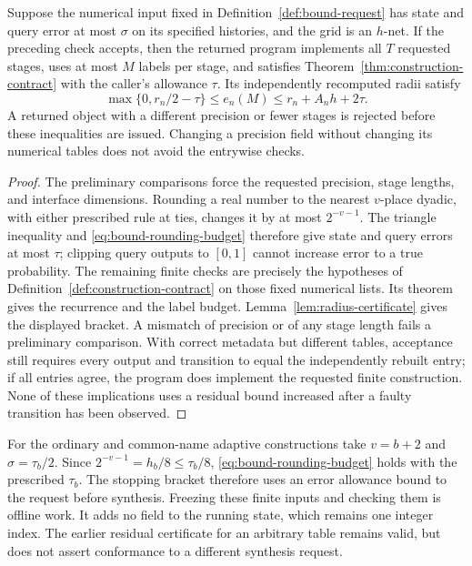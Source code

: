 \begin{proposition}
\label{prop:request-conformance}
Suppose the numerical input fixed in Definition~\ref{def:bound-request}
has state and query error at most $\sigma$ on its specified histories,
and the grid is an $h$-net. If the preceding check accepts, then the
returned program implements all $T$ requested stages, uses at most $M$
labels per stage, and satisfies Theorem~\ref{thm:construction-contract}
with the caller's allowance $\tau$. Its independently recomputed radii
satisfy
\[
 \max\{0,r_n/2-\tau\}\le e_n(M)
      \le r_n+A_nh+2\tau.
\]
A returned object with a different precision or fewer stages is rejected
before these inequalities are issued. Changing a precision field without
changing its numerical tables does not avoid the entrywise checks.
\end{proposition}
\begin{proof}
The preliminary comparisons force the requested precision, stage lengths,
and interface dimensions. Rounding a real number to the nearest
$v$-place dyadic, with either prescribed rule at ties, changes it by at
most $2^{-v-1}$. The triangle inequality and
\eqref{eq:bound-rounding-budget} therefore give state and query errors
at most $\tau$; clipping query outputs to $[0,1]$ cannot increase
error to a true probability. The remaining finite checks are precisely
the hypotheses of Definition~\ref{def:construction-contract} on those
fixed numerical lists. Its theorem gives the recurrence and the label
budget. Lemma~\ref{lem:radius-certificate} gives the displayed bracket.
A mismatch of precision or of any stage length fails a preliminary
comparison. With correct metadata but different tables, acceptance still
requires every output and transition to equal the independently rebuilt
entry; if all entries agree, the program does implement the requested
finite construction. None of these implications uses a residual bound
increased after a faulty transition has been observed.
\end{proof}

For the ordinary and common-name adaptive constructions take $v=b+2$
and $\sigma=\tau_b/2$. Since $2^{-v-1}=h_b/8\le\tau_b/8$,
\eqref{eq:bound-rounding-budget} holds with the prescribed $\tau_b$.
The stopping bracket therefore uses an error allowance bound to the
request before synthesis. Freezing these finite inputs and checking them
is offline work. It adds no field to the running state, which remains
one integer index. The earlier residual certificate for an arbitrary
table remains valid, but does not assert conformance to a different
synthesis request.
